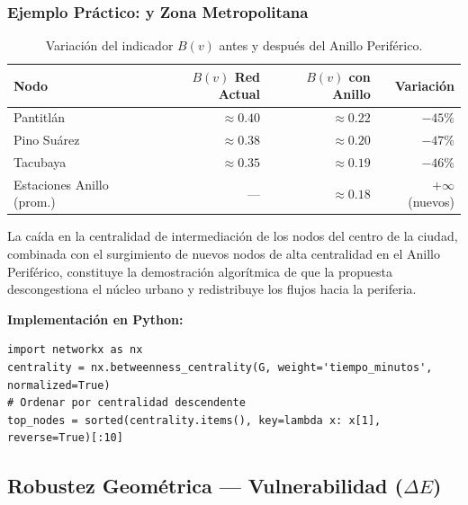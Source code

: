 \subsubsection{Ejemplo Práctico: \cdmx{} y Zona Metropolitana}

\begin{table}[H]
    \centering
    \caption{Variación del indicador $B(v)$ antes y después del Anillo Periférico.}
    \label{tab:betweenness}
    \begin{tabularx}{\textwidth}{X r r r}
        \toprule
        \textbf{Nodo} & \textbf{$B(v)$ Red Actual} &
        \textbf{$B(v)$ con Anillo} & \textbf{Variación} \\
        \midrule
        Pantitlán               & $\approx 0.40$ & $\approx 0.22$ & $-45\%$ \\
        Pino Suárez             & $\approx 0.38$ & $\approx 0.20$ & $-47\%$ \\
        Tacubaya                & $\approx 0.35$ & $\approx 0.19$ & $-46\%$ \\
        Estaciones Anillo (prom.) & ---          & $\approx 0.18$ & $+\infty$ (nuevos) \\
        \bottomrule
    \end{tabularx}
\end{table}

La caída en la centralidad de intermediación de los nodos del centro de la ciudad,
combinada con el surgimiento de nuevos nodos de alta centralidad en el Anillo
Periférico, constituye la demostración algorítmica de que la propuesta descongestiona
el núcleo urbano y redistribuye los flujos hacia la periferia.

\textbf{Implementación en Python:}

\begin{lstlisting}[style=estiloPython, caption={Cálculo de Centralidad de Intermediación con NetworkX.}, label={lst:betweenness}]
import networkx as nx
centrality = nx.betweenness_centrality(G, weight='tiempo_minutos', normalized=True)
# Ordenar por centralidad descendente
top_nodes = sorted(centrality.items(), key=lambda x: x[1], reverse=True)[:10]
\end{lstlisting}


\subsection{Robustez Geométrica --- Vulnerabilidad \texorpdfstring{($\Delta E$)}{(Delta E)}}
\label{subsec:robustez-geometrica}

